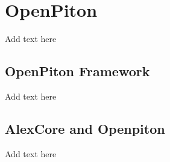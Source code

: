 \documentclass[../main.tex]{subfiles}
\begin{document}
\section{OpenPiton}
Add text here

\subsection{OpenPiton Framework}
Add text here

\subsection{AlexCore and Openpiton}
Add text here
\end{document}
